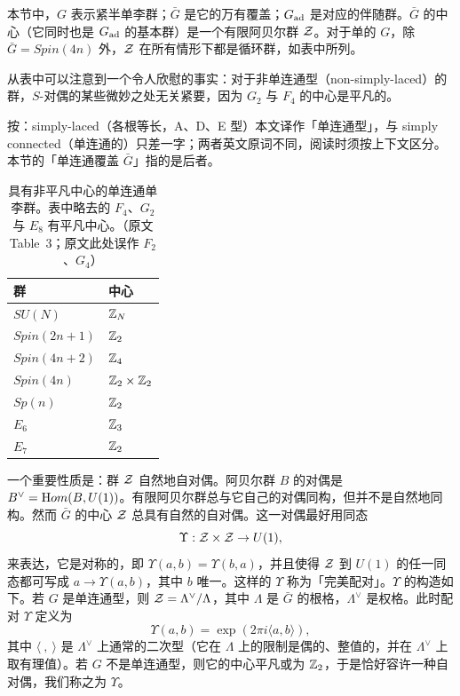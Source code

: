 \label{sec:reviewthis}

本节中，$G$ 表示紧半单李群；$\bar G$ 是它的万有覆盖；$G_{\rm {ad}}$ 是对应的伴随群。$\bar G$ 的中心（它同时也是 $G_{\rm {ad}}$ 的基本群）是一个有限阿贝尔群 $\CZ$。对于单的 $G$，除 $\bar G=Spin(4n)$ 外，$\CZ$ 在所有情形下都是循环群，如表中所列。

从表中可以注意到一个令人欣慰的事实：对于非单连通型（non-simply-laced）的群，$S$-对偶的某些微妙之处无关紧要，因为 $G_2$ 与 $F_4$ 的中心是平凡的。

\begin{yizhu}[术语]
按：simply-laced（各根等长，A、D、E 型）本文译作「单连通型」，与 simply connected（单连通的）只差一字；两者英文原词不同，阅读时须按上下文区分。本节的「单连通覆盖 $\bar G$」指的是后者。
\end{yizhu}

\par\medskip

\begin{table}[htbp]
\centering
\begin{tabular}{ll}
\toprule
群 & 中心 \\
\midrule
$SU(N)$ & $\Bbb{Z}_N$ \\
$Spin(2n+1)$ & $\Bbb{Z}_2$ \\
$Spin(4n+2)$ & $\Bbb{Z}_4$ \\
$Spin(4n)$ & $\Bbb{Z}_2\times\Bbb{Z}_2$ \\
$Sp(n)$ & $\Bbb{Z}_2$ \\
$E_6$ & $\Bbb{Z}_3$ \\
$E_7$ & $\Bbb{Z}_2$ \\
\bottomrule
\end{tabular}
\caption{具有非平凡中心的单连通单李群。表中略去的 $F_4$、$G_2$ 与 $E_8$ 有平凡中心。（原文 Table~3；原文此处误作 $F_2$、$G_4$）}
\label{tab:centers}
\end{table}

一个重要性质是：群 ${\cal Z}$ 自然地自对偶。阿贝尔群 $B$ 的对偶是 $B^\vee={\rm Hom}(B,U(1))$。有限阿贝尔群总与它自己的对偶同构，但并不是自然地同构。然而 $\bar G$ 的中心 $\CZ$ 总具有自然的自对偶。这一对偶最好用同态 %
\setcounter{equation}{0}
\begin{equation}\label{eq:plook}
\Upsilon:\CZ\times \CZ\to
U(1),
\end{equation}
来表达，它是对称的，即 $\Upsilon(a,b)=\Upsilon(b,a)$，并且使得 $\CZ$ 到 $U(1)$ 的任一同态都可写成 $a\to \Upsilon(a,b)$，其中 $b$ 唯一。这样的 $\Upsilon$ 称为「完美配对」。$\Upsilon$ 的构造如下。若 $G$ 是单连通型，则 $\CZ=\Lambda^\vee/\Lambda$，其中 $\Lambda$ 是 $\bar G$ 的根格，$\Lambda^\vee$ 是权格。此时配对 $\Upsilon$ 定义为
\setcounter{equation}{1}
\begin{equation}\label{eq:rofo}
\Upsilon(a,b)=\exp(2\pi i\langle a,b\rangle),
\end{equation}
其中 $\langle~,~\rangle$ 是 $\Lambda^\vee$ 上通常的二次型（它在 $\Lambda$ 上的限制是偶的、整值的，并在 $\Lambda^\vee$ 上取有理值）。若 $G$ 不是单连通型，则它的中心平凡或为 $\Bbb{Z}_2$，于是恰好容许一种自对偶，我们称之为 $\Upsilon$。

